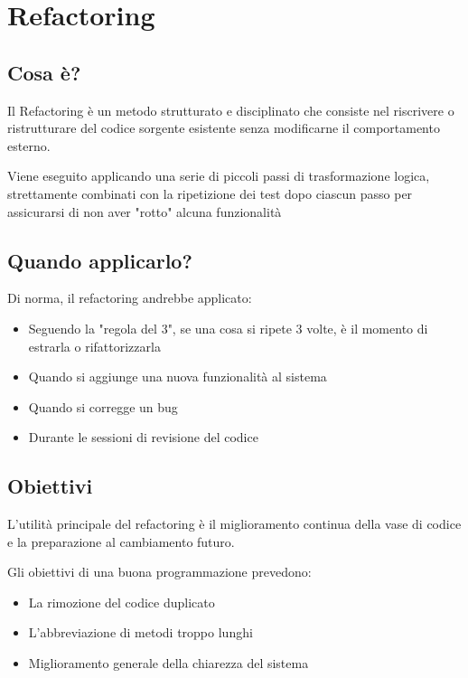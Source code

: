 \chapter{Refactoring}
\section{Cosa è?}
Il Refactoring è un metodo strutturato e disciplinato che consiste nel riscrivere o ristrutturare del codice sorgente esistente senza modificarne il comportamento esterno.

Viene eseguito applicando una serie di piccoli passi di trasformazione logica, strettamente combinati con la ripetizione dei test dopo ciascun passo per assicurarsi di non aver "rotto" alcuna funzionalità

\section{Quando applicarlo?}
Di norma, il refactoring andrebbe applicato:
\begin{itemize}
    \item Seguendo la "regola del 3", se una cosa si ripete 3 volte, è il momento di estrarla o rifattorizzarla
    \item Quando si aggiunge una nuova funzionalità al sistema
    \item Quando si corregge un bug
    \item Durante le sessioni di revisione del codice
\end{itemize}

\section{Obiettivi}
L'utilità principale del refactoring è il miglioramento continua della vase di codice e la preparazione al cambiamento futuro.

Gli obiettivi di una buona programmazione prevedono:
\begin{itemize}
    \item La rimozione del codice duplicato
    \item L'abbreviazione di metodi troppo lunghi
    \item Miglioramento generale della chiarezza del sistema
\end{itemize}

